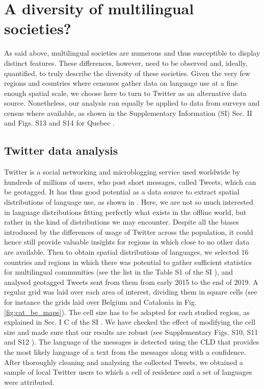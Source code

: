 \documentclass[../thesis.tex]{subfiles}
\begin{document}
\section{A diversity of multilingual societies?}
As said above, multilingual societies are numerous and thus susceptible to display
distinct features. These differences, however, need to be observed and, ideally,
quantified, to truly describe the diversity of these societies. Given the very few
regions and countries where censuses gather data on language use at a fine enough
spatial scale, we choose here to turn to Twitter as an alternative data source.
Nonetheless, our analysis can equally be applied to data from surveys and census where
available, as shown in the Supplementary Information (SI) Sec. II and Figs. S13 and S14
for Quebec \cite{supp}.


\subsection{Twitter data analysis}
Twitter is a social networking and microblogging service used worldwide by hundreds of
millions of users, who post short messages, called Tweets, which can be geotagged. It
has thus good potential as a data source to extract spatial distributions of language
use, as shown in
\cite{MocanuTwitterBabel2013,PavalanathanConfoundsConsequences2015,GoncalvesCrowdsourcingDialect2014,HuangUnderstandingRegional2016,GoncalvesMappingAmericanization2018,DunnMappingLanguages2020}.
Here, we are not so much interested in language distributions fitting perfectly what
exists in the offline world, but rather in the kind of distributions we may encounter.
Despite all the biases introduced by the differences of usage of Twitter across the
population, it could hence still provide valuable insights for regions in which close to
no other data are available. Then to obtain spatial distributions of languages, we
selected 16 countries and regions in which there was potential to gather sufficient
statistics for multilingual communities (see the list in the Table S1 of the SI
\cite{supp}), and analysed geotagged Tweets sent from them from early 2015 to the end
of 2019. A regular grid was laid over each area of interest, dividing them in square
cells (see for instance the grids laid over Belgium and Catalonia in Fig.
\ref{fig:cat_be_maps}). The cell size has to be adapted for each studied region, as
explained in Sec. I C of the SI \cite{supp}. We have checked the effect of modifying the
cell size and made sure that our results are robust (see Supplementary Figs. S10, S11
and S12 \cite{supp}). The language of the messages is detected using the \ac{CLD} that
provides the most likely language of a text from the messages along with a confidence.
After thoroughly cleaning and analysing the collected Tweets, we obtained a sample of
local Twitter users to which a cell of residence and a set of languages were attributed.
\end{document}
